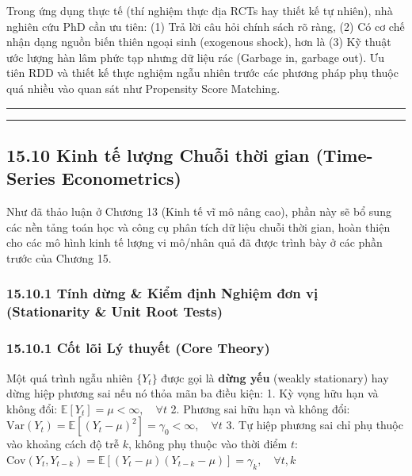 \documentclass[
]{article}
\begin{document}
Trong ứng dụng thực tế (thí nghiệm thực địa RCTs hay thiết kế tự nhiên),
nhà nghiên cứu PhD cần ưu tiên: (1) Trả lời câu hỏi chính sách rõ ràng,
(2) Có cơ chế nhận dạng nguồn biến thiên ngoại sinh (exogenous shock),
hơn là (3) Kỹ thuật ước lượng hàn lâm phức tạp nhưng dữ liệu rác
(Garbage in, garbage out). Ưu tiên RDD và thiết kế thực nghiệm ngẫu
nhiên trước các phương pháp phụ thuộc quá nhiều vào quan sát như
Propensity Score Matching.

\begin{center}\rule{0.5\linewidth}{0.5pt}\end{center}

\begin{center}\rule{0.5\linewidth}{0.5pt}\end{center}

\subsection{15.10 Kinh tế lượng Chuỗi thời gian (Time-Series
Econometrics)}\label{kinh-tux1ebf-lux1b0ux1ee3ng-chuux1ed7i-thux1eddi-gian-time-series-econometrics}

Như đã thảo luận ở Chương 13 (Kinh tế vĩ mô nâng cao), phần này sẽ bổ
sung các nền tảng toán học và công cụ phân tích dữ liệu chuỗi thời gian,
hoàn thiện cho các mô hình kinh tế lượng vi mô/nhân quả đã được trình
bày ở các phần trước của Chương 15.

\subsubsection{15.10.1 Tính dừng \& Kiểm định Nghiệm đơn vị
(Stationarity \& Unit Root
Tests)}\label{tuxednh-dux1eebng-kiux1ec3m-ux111ux1ecbnh-nghiux1ec7m-ux111ux1a1n-vux1ecb-stationarity-unit-root-tests}

\subsubsection{15.10.1 Cốt lõi Lý thuyết (Core
Theory)}\label{cux1ed1t-luxf5i-luxfd-thuyux1ebft-core-theory-55}

Một quá trình ngẫu nhiên \(\{Y_t\}\) được gọi là \textbf{dừng yếu}
(weakly stationary) hay dừng hiệp phương sai nếu nó thỏa mãn ba điều
kiện: 1. Kỳ vọng hữu hạn và không đổi:
\(\mathbb{E}[Y_t] = \mu < \infty, \quad \forall t\) 2. Phương sai hữu
hạn và không đổi:
\(\text{Var}(Y_t) = \mathbb{E}[(Y_t - \mu)^2] = \gamma_0 < \infty, \quad \forall t\)
3. Tự hiệp phương sai chỉ phụ thuộc vào khoảng cách độ trễ \(k\), không
phụ thuộc vào thời điểm \(t\):
\(\text{Cov}(Y_t, Y_{t-k}) = \mathbb{E}[(Y_t - \mu)(Y_{t-k} - \mu)] = \gamma_k, \quad \forall t, k\)
\end{document}
